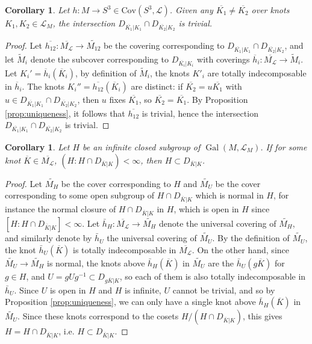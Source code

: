\documentclass{amsart}
\theoremstyle{plain}
\theoremstyle{definition}
\theoremstyle{plain}
\theoremstyle{plain}
\newtheorem{corollary}[theorem]{Corollary}
\theoremstyle{plain}
\theoremstyle{remark}
\theoremstyle{remark}
\theoremstyle{plain}
\theoremstyle{definition}
\theoremstyle{plain}
\DeclareMathOperator{\Gal}{\mathrm{Gal}}
\theoremstyle{plain}
\theoremstyle{plain}
\numberwithin{equation}{section}
\begin{document}
\begin{corollary}\label{cor:intersection}
Let $h: M \to S^3 \in \mathrm{Cov}(S^3, \mathcal{L})$. Given any $\overline{K_1} \neq \overline{K_2}$ over knots $K_1, K_2 \in \mathcal{L}_M$, the intersection $D_{\overline{K_1}|K_1} \cap D_{\overline{K_2}|K_2}$ is trivial.
\end{corollary}

\begin{proof}
Let $\overline{h_{12}}: \overline{M_{\mathcal{L}}} \to \widetilde{M_{12}}$ be the covering corresponding to $D_{\overline{K_1}|K_1} \cap D_{\overline{K_2}|K_2}$, and let $\widetilde M_i$ denote the subcover corresponding to $D_{\overline{K_i}|K_i}$ with coverings $\overline{h}_i: \overline{M_{\mathcal{L}}} \to \widetilde M_i$. Let $K_i' = \overline{h}_i(\overline{K}_i)$, by definition of $\widetilde{M}_i$, the knots $K'_i$ are totally indecomposable in $\overline{h}_i$. The knots $K_i'' = \overline{h_{12}}(\overline K_i)$ are distinct: if $\overline{K_2} = u\overline{K_1}$ with $u \in D_{\overline{K_1}|K_1} \cap D_{\overline{K_2}|K_2}$, then $u$ fixes $\overline{K_1}$, so $\overline{K_2} = \overline{K_1}$. By Proposition \ref{prop:uniqueness}, it follows that $\overline{h_{12}}$ is trivial, hence the intersection $D_{\overline{K_1}|K_1} \cap D_{\overline{K_2}|K_2}$ is trivial.
\end{proof}

\begin{corollary}\label{cor:passtofinitecovers}
Let $H$ be an infinite closed subgroup of $\Gal(M,\mathcal{L}_M)$. If for some knot $\overline{K}\in \overline{M_{\mathcal{L}}}$, $(H:H\cap D_{\overline{K}|K})<\infty$, then $H\subset D_{\overline{K}|K}$.
\end{corollary}

\begin{proof}
Let $\widetilde{M_H}$ be the cover corresponding to $H$ and $\widetilde{M_U}$ be the cover corresponding to some open subgroup of $H\cap D_{\overline{K}|K}$ which is normal in $H$, for instance the normal closure of $H \cap D_{\overline K|K}$ in $H$, which is open in $H$ since $[H:H \cap D_{\overline K|K}] < \infty$. Let $\bar{h}_H:\overline{M_{\mathcal{L}}}\rightarrow \widetilde{M_H}$ denote the universal covering of $\widetilde{M_H}$, and similarly denote by $\bar{h}_U$ the universal covering of $\widetilde{M_U}$. By the definition of $\widetilde{M_U}$, the knot $\bar{h}_U(\overline{K})$ is totally indecomposable in $\overline{M_{\mathcal{L}}}$. On the other hand, since $\widetilde{M_U} \to \widetilde{M_H}$ is normal, the knots above $\bar{h}_H(\overline{K})$ in $\widetilde{M_U}$ are the $\bar h_U(g\overline K)$ for $g \in H$, and $U = gUg^{-1} \subset D_{g\overline K|K}$, so each of them is also totally indecomposable in $\bar{h}_U$. Since $U$ is open in $H$ and $H$ is infinite, $U$ cannot be trivial, and so by Proposition \ref{prop:uniqueness}, we can only have a single knot above $\bar{h}_H(\overline{K})$ in $\widetilde{M_U}$. Since these knots correspond to the cosets $H/(H \cap D_{\overline K|K})$, this gives $H = H \cap D_{\overline K|K}$, i.e. $H \subset D_{\overline K|K}$.
\end{proof}
\end{document}
